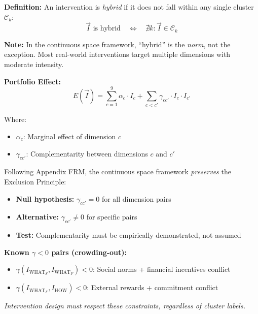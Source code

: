 \begin{tcolorbox}[colback=gray!5!white, colframe=gray!75!black,
    title=Definition HHH-D1: Interventions Outside Clusters]
\textbf{Definition:} An intervention is \textit{hybrid} if it does not fall within any single cluster $\mathcal{C}_k$:
\begin{equation}
\vec{I} \text{ is hybrid} \quad \Leftrightarrow \quad \nexists k: \vec{I} \in \mathcal{C}_k
\end{equation}

\textbf{Note:} In the continuous space framework, ``hybrid'' is the \textit{norm}, not the exception. Most real-world interventions target multiple dimensions with moderate intensity.

\textbf{Portfolio Effect:}
\begin{equation}
E(\vec{I}) = \sum_{c=1}^{9} \alpha_c \cdot I_c + \sum_{c < c'} \gamma_{cc'} \cdot I_c \cdot I_{c'}
\label{eq:hhh-portfolio-effect}
\end{equation}

Where:
\begin{itemize}[nosep]
    \item $\alpha_c$: Marginal effect of dimension $c$
    \item $\gamma_{cc'}$: Complementarity between dimensions $c$ and $c'$
\end{itemize}
\end{tcolorbox}

\begin{tcolorbox}[colback=red!5!white, colframe=red!75!black,
    title=\textbf{Methodological Note: Exclusion Principle in Continuous Space}]
Following Appendix FRM, the continuous space framework \textit{preserves} the Exclusion Principle:

\begin{itemize}[nosep]
    \item \textbf{Null hypothesis:} $\gamma_{cc'} = 0$ for all dimension pairs
    \item \textbf{Alternative:} $\gamma_{cc'} \neq 0$ for specific pairs
    \item \textbf{Test:} Complementarity must be empirically demonstrated, not assumed
\end{itemize}

\textbf{Known $\gamma < 0$ pairs (crowding-out):}
\begin{itemize}[nosep]
    \item $\gamma(I_{\text{WHAT}_S}, I_{\text{WHAT}_F}) < 0$: Social norms + financial incentives conflict
    \item $\gamma(I_{\text{WHAT}_F}, I_{\text{HOW}}) < 0$: External rewards + commitment conflict
\end{itemize}

\textit{Intervention design must respect these constraints, regardless of cluster labels.}
\end{tcolorbox}



